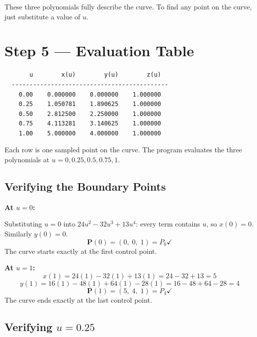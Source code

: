\documentclass[12pt, a4paper]{article}
\begin{document}
These three polynomials fully describe the curve.
To find any point on the curve, just substitute a value of $u$.


\section{Step 5 --- Evaluation Table}

\begin{verbatim}
       u        x(u)        y(u)        z(u)
  --------------------------------------------
    0.00    0.000000    0.000000    1.000000
    0.25    1.050781    1.890625    1.000000
    0.50    2.812500    2.250000    1.000000
    0.75    4.113281    3.140625    1.000000
    1.00    5.000000    4.000000    1.000000
\end{verbatim}

Each row is one sampled point on the curve.
The program evaluates the three polynomials at $u = 0, 0.25, 0.5, 0.75, 1$.

\subsection{Verifying the Boundary Points}

\begin{examplebox}
\textbf{At $u = 0$:}

Substituting $u = 0$ into $24u^2 - 32u^3 + 13u^4$:
every term contains $u$, so $x(0) = 0$.
Similarly $y(0) = 0$.
\[
  \mathbf{P}(0) = (0,\; 0,\; 1) = P_0 \checkmark
\]
The curve starts exactly at the first control point.

\medskip
\textbf{At $u = 1$:}
\[
  x(1) = 24(1) - 32(1) + 13(1) = 24 - 32 + 13 = 5
\]
\[
  y(1) = 16(1) - 48(1) + 64(1) - 28(1) = 16 - 48 + 64 - 28 = 4
\]
\[
  \mathbf{P}(1) = (5,\; 4,\; 1) = P_4 \checkmark
\]
The curve ends exactly at the last control point.
\end{examplebox}

\subsection{Verifying $u = 0.25$}
\end{document}
